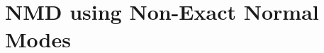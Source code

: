 \documentclass[aps,prb,onecolumn,preprint,superscriptaddress,amsmath,amssymb,floatfix]{revtex4}
\begin{document}


\section{\label{A:NMD XCORR}
NMD using Non-Exact Normal Modes}
\end{document}
